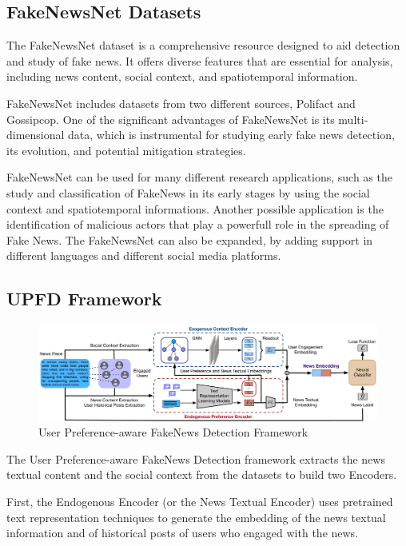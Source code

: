 \documentclass[12pt]{article}
\begin{document}
\subsection{FakeNewsNet Datasets}

The FakeNewsNet dataset is a comprehensive resource designed to aid detection and study of fake news. 
It offers  diverse features that are essential for analysis, including news content, social context, and spatiotemporal information. 

FakeNewsNet includes datasets from two different sources, Polifact and Gossipcop.
One of the significant advantages of FakeNewsNet is its multi-dimensional data, 
which is instrumental for studying early fake news detection, its evolution, and potential mitigation strategies. 

FakeNewsNet can be used for many different research applications, 
such as the study and classification of FakeNews in its early stages by using the social context and spatiotemporal informations.
Another possible application is the identification of malicious actors that play a powerfull role in the spreading of 
Fake News. The FakeNewsNet can also be expanded, by adding support in different languages and different social media platforms.

\subsection{UPFD Framework}

\begin{figure}
    \centering
    \includegraphics[width=\textwidth]{upfd_framework.pdf}
    \caption{User Preference-aware FakeNews Detection Framework}
    \label{fig:upfd_framework}
\end{figure}

The User Preference-aware FakeNews Detection framework extracts the 
news textual content and the social context from the datasets to build two Encoders. 

First, the Endogenous Encoder (or the News Textual Encoder) uses pretrained text representation techniques 
to generate the embedding of the news textual information and of historical posts of users who engaged with the news.
\end{document}
